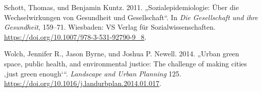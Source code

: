 \documentclass[
  ngerman,
]{article}
\newlength{\cslhangindent}
\newlength{\cslentryspacingunit} %
\newenvironment{CSLReferences}[2] %
 {%
  \setlength{\parindent}{0pt}
  \ifodd #1
  \let\oldpar\par
  \def\par{\hangindent=\cslhangindent\oldpar}
  \fi
  \setlength{\parskip}{#2\cslentryspacingunit}
 }%
 {}
\begin{document}
\begin{CSLReferences}{1}{0}
\leavevmode{}%
Schott, Thomas, und Benjamin Kuntz. 2011. {„Sozialepidemiologie: {Ü}ber die Wechselwirkungen von Gesundheit und Gesellschaft``}. In \emph{Die Gesellschaft und ihre Gesundheit}, 159--71. Wiesbaden: {VS} Verlag f{ü}r Sozialwissenschaften. \url{https://doi.org/10.1007/978-3-531-92790-9_8}.

\leavevmode{}%
Wolch, Jennifer R., Jason Byrne, und Joshua P. Newell. 2014. {„Urban green space, public health, and environmental justice: The challenge of making cities {‚just green enough`}``}. \emph{Landscape and Urban Planning} 125. \url{https://doi.org/10.1016/j.landurbplan.2014.01.017}.

\end{CSLReferences}
\end{document}
